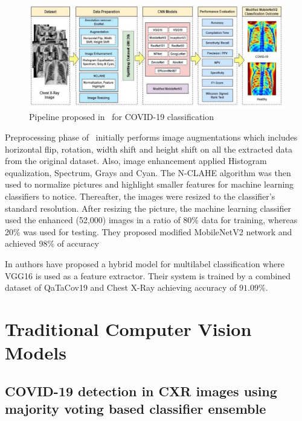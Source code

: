 \begin{figure}
    \begin{center}
        \includegraphics[width=\textwidth]{Figures/AkterPipeline.png}
        \caption{\label{fig:akterPipeline} Pipeline proposed in~\cite{akt} for COVID-19 classification}
    \end{center}
\end{figure}

Preprocessing phase of~\cite{akt} initially performs image augmentations which includes horizontal flip, rotation, width shift and height shift on all the extracted data from the original dataset. Also, image enhancement applied Histogram equalization, Spectrum, Grays and Cyan. The N-CLAHE algorithm was then used to normalize pictures and highlight smaller features for machine learning classifiers to notice. Thereafter, the images were resized to the classifier’s standard resolution. After resizing the picture, the machine learning classifier used the enhanced (52,000) images in a ratio of 80\% data for training, whereas 20\% was used for testing. They proposed modified MobileNetV2 network and achieved 98\% of accuracy

In \cite{hyp} authors have proposed a hybrid model for multilabel classification where VGG16 is used as a feature extractor. Their system is trained by a combined dataset of QaTaCov19 and Chest X-Ray achieving accuracy of $91.09$\%.
\section{Traditional Computer Vision Models}
\subsection{ COVID-19 detection in CXR images using
majority voting based classifier ensemble}

